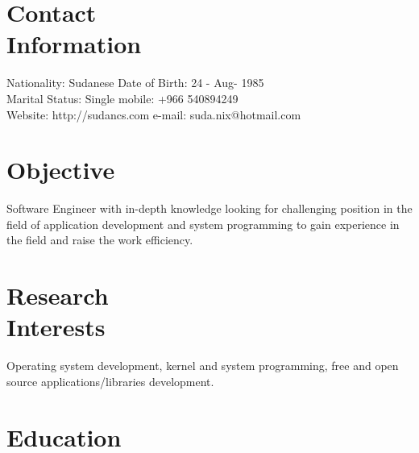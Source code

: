 \documentclass[margin,line]{resume}
\begin{document}
\begin{resume}

    \section{\mysidestyle Contact\\Information}

    Nationality: Sudanese                            \hfill Date of Birth: 24 - Aug- 1985 \vspace{0mm}\\\vspace{0mm}%
   Marital Status: Single                              \hfill mobile: +966 540894249          \vspace{0mm}\\\vspace{0mm}%
    Website:	  http://sudancs.com      \hfill e-mail: suda.nix@hotmail.com  \vspace{0mm}\\\vspace{-4.5mm}%

\section{\mysidestyle Objective}
Software Engineer with in-depth knowledge looking for challenging position in the field of application development and system programming to gain experience in the field and raise the work efficiency.

    \section{\mysidestyle Research\\Interests}
Operating system development, kernel and system programming, free and open source applications/libraries development.

    \section{\mysidestyle Education}


\end{resume}
\end{document}
